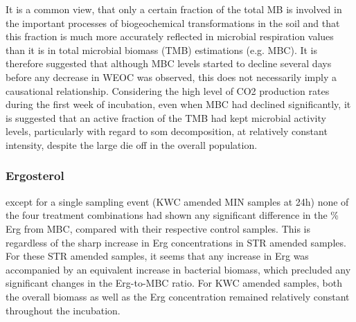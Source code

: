 	It is a common view, that only a certain fraction of the total MB  is involved in the important processes of biogeochemical transformations in the soil \citep{blagodatskaya2013, salazar-villegas2016} and that this fraction is much more accurately reflected in microbial respiration values than it is in total microbial biomass (TMB) estimations (e.g. MBC)\citep{salazar-villegas2016}. It is therefore suggested that although MBC levels started to decline several days before any decrease in WEOC was observed, this does not necessarily imply a causational relationship. Considering the high level of CO2 production rates during the first week of incubation, even when MBC had declined significantly, it is suggested that an active fraction of the TMB had kept microbial activity levels, particularly with regard to \gls{som} decomposition, at relatively constant intensity, despite the large die off in the overall population. \\


		\subsubsection{Ergosterol}

			except for a single sampling event (KWC amended MIN samples at 24h) none of the four treatment combinations had shown any significant difference in the \% Erg from MBC, compared with their respective control samples. This is regardless of the sharp increase in Erg concentrations in STR amended samples. For these STR amended samples, it seems that any increase in Erg was accompanied by an equivalent increase in bacterial biomass, which precluded any significant changes in the Erg-to-MBC ratio. For KWC amended samples, both the overall biomass as well as the Erg concentration remained relatively constant throughout the incubation. \\


